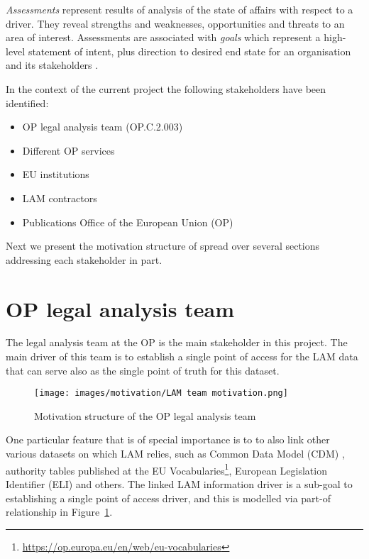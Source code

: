 	\textit{Assessments} represent results of analysis of the state of affairs with respect to a driver. They reveal strengths and weaknesses, opportunities and threats to an area of interest. Assessments are associated with \textit{goals} which represent a high-level statement of intent, plus direction to desired end state for an organisation and its stakeholders \citep{archimate3.1}. 
	
	In the context of the current project the following stakeholders have been identified:
	
	\enlargethispage{1em}
	
	\begin{itemize}
		\item OP legal analysis team (OP.C.2.003)
		\item Different OP services
		\item EU institutions
		\item LAM contractors
		\item Publications Office of the European Union (OP)
	\end{itemize}

	Next we present the motivation structure of spread over several sections addressing each stakeholder in part.
	
	\section{OP legal analysis team}

	The legal analysis team at the OP is the main stakeholder in this project. The main driver of this team is to establish a single point of access for the LAM data that can serve also as the single point of truth for this dataset. 
	
	\begin{figure}[h]
	\centering
	\texttt{[image: images/motivation/LAM team motivation.png]}
	\caption{Motivation structure of the OP legal analysis team}
	\label{fig:motivation-lam-team}
	\end{figure}
	
	One particular feature that is of special importance is to to also link other various datasets on which LAM relies, such as Common Data Model (CDM) \citep{cdm-francesconi2015ontology, cdm-francesconi2015semantic}, authority tables published at the EU Vocabularies\footnote{\url{https://op.europa.eu/en/web/eu-vocabularies}}, European Legislation Identifier (ELI) and others. The linked LAM information driver is a sub-goal to establishing a single point of access driver, and this is modelled via part-of relationship in \mbox{Figure \ref{fig:motivation-lam-team}}.
	
